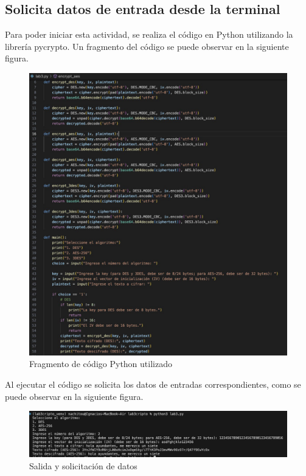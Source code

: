\documentclass[letter,12pt]{article}
\begin{document}
\subsection{Solicita datos de entrada desde la terminal}

Para poder iniciar esta actividad, se realiza el código en Python utilizando la librería pycrypto. Un fragmento del código se puede observar en la siguiente figura.

\begin{figure}[H]
    \centering
    \includegraphics[width=0.9\linewidth]{imagenes/codigo 1.jpg}
    \caption{Fragmento de código Python utilizado}
    \label{fig:enter-label}
\end{figure}

Al ejecutar el código se solicita los datos de entradas correspondientes, como se puede observar en la siguiente figura.

\begin{figure}[H]
    \centering
    \includegraphics[width=0.9\linewidth]{imagenes/salida 1.jpg}
    \caption{Salida y solicitación de datos}
    \label{fig:enter-label}
\end{figure}
\end{document}

